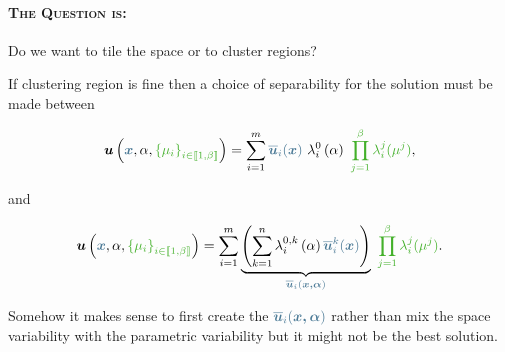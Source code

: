 \paragraph{\textsc{The Question is:}} Do we want to tile the space or to cluster regions?


If clustering region is fine then a choice of separability for the solution must be made between

    \begin{equation}
        \vect{u}\left(\textcolor{BleuLMS!70}{\vect{x}}, \alpha, \textcolor{LGreenLMS}{\left\{\mu_i\right\}_{i \in \llbracket 1, \beta \rrbracket}}\right) = \sum\limits_{i=1}^m \textcolor{BleuLMS!70}{\overline{\vect{u}}_i(\vect{x})}~\lambda_i^0\left( \alpha \right) ~\textcolor{LGreenLMS}{\prod_{j=1}^{\beta}\lambda_i^j(\mu^j)},
    \end{equation}

    and

    
    \begin{equation}
        \vect{u}\left(\textcolor{BleuLMS!70}{\vect{x}}, \alpha, \textcolor{LGreenLMS}{\left\{\mu_i\right\}_{i \in \llbracket 1, \beta \rrbracket}}\right) = \sum\limits_{i=1}^m \underbrace{\left (\sum\limits_{k=1}^n \lambda_i^{0,k}\left( \alpha \right) \textcolor{BleuLMS!70}{\overline{\vect{u}}_i^k(\vect{x})} \right)}_{\textcolor{BleuLMS!70}{\overline{\vect{u}}_i(\vect{x,\alpha})}} ~\textcolor{LGreenLMS}{\prod_{j=1}^{\beta}\lambda_i^j(\mu^j)}.
    \end{equation}


    Somehow it makes sense to first create the $\textcolor{BleuLMS!70}{\overline{\vect{u}}_i(\vect{x,\alpha})}$ rather than mix the space variability with the parametric variability but it might not be the best solution.


